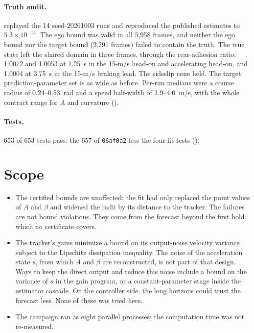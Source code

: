 \documentclass[11pt]{article}
\begin{document}
\paragraph{Truth audit.}  replayed
the 14 seed-20261003 runs and reproduced the published estimates to
$5.3\times10^{-15}$. The ego bound was valid in all 5,958 frames, and neither
the ego bound nor the target bound (2,291 frames) failed to contain the truth.
The true state left the shared domain in three frames, through the
rear-adhesion ratio: 1.0072 and 1.0053 at 1.25~s in the 15-m/s head-on and
accelerating head-on, and 1.0004 at 3.75~s in the 15-m/s braking lead. The
sideslip cone held. The target prediction-parameter set is as wide as before.
Per-run medians were a course radius of 0.24--0.53~rad and a speed half-width
of 1.9--4.0~m/s, with the whole contract range for $A$ and curvature
().

\paragraph{Tests.} 653 of 653 tests pass: the 657 of \texttt{06af0a2} less
the four fit tests ().

\section{Scope}
\begin{itemize}
\item The certified bounds are unaffected: the fit had only replaced the point
  values of $A$ and $\beta$ and widened the radii by its distance to the
  tracker. The failures are not bound violations. They come from the forecast
  beyond the first hold, which no certificate covers.
\item The tracker's gains minimize a bound on its output-noise velocity
  variance subject to the Lipschitz dissipation inequality. The noise of the
  acceleration state $s$, from which $A$ and $\beta$ are reconstructed, is not
  part of that design. Ways to keep the direct output and reduce this noise
  include a bound on the variance of $s$ in the gain program, or a
  constant-parameter stage inside the estimator cascade. On the controller
  side, the long horizons could trust the forecast less. None of these was
  tried here.
\item The campaign ran as eight parallel processes; the computation time was
  not re-measured.
\end{itemize}
\end{document}
